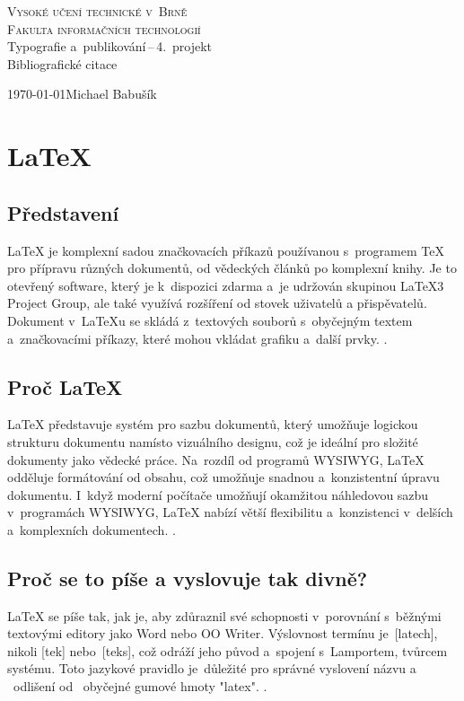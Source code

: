 \documentclass[a4paper, 11pt]{article}
\begin{document}
\begin{titlepage}
    \begin{center}
        \Huge \textsc{Vysoké učení technické v~Brně} \\
        \huge \textsc{Fakulta informačních technologií} \\
        \LARGE{Typografie a~publikování\,--\,4.~projekt} \\
        \Huge{Bibliografické citace}
    \end{center}

    {\Large \today \hfill Michael Babušík}
\end{titlepage}

\section{\LaTeX}
\subsection{Představení}
\LaTeX{} je komplexní sadou značkovacích příkazů používanou s~programem \TeX{} pro přípravu různých dokumentů, od vědeckých článků po komplexní knihy. 
Je to otevřený software, který je k~dispozici zdarma a~je udržován skupinou \LaTeX3 Project Group, ale také využívá rozšíření od stovek uživatelů a přispěvatelů. 
Dokument v~\LaTeX{}u se skládá z~textových souborů s~obyčejným textem a~značkovacími příkazy, které mohou vkládat grafiku a~další prvky.
\cite{Kopka_Daly2004}.

\subsection{Proč \LaTeX}
\LaTeX{} představuje systém pro sazbu dokumentů, který umožňuje logickou strukturu dokumentu namísto vizuálního designu, což je ideální pro složité dokumenty jako vědecké práce. 
Na~rozdíl od programů WYSIWYG, \LaTeX{} odděluje formátování od obsahu, což umožňuje snadnou a~konzistentní úpravu dokumentu. 
I~když moderní počítače umožňují okamžitou náhledovou sazbu v~programách WYSIWYG, \LaTeX{} nabízí větší flexibilitu a~konzistenci v~delších a~komplexních dokumentech.
\cite{Lamport1994}.

\subsection{Proč se to píše a vyslovuje tak divně?}
\LaTeX{} se píše tak, jak je, aby zdůraznil své schopnosti v~porovnání s~běžnými textovými editory jako Word nebo OO Writer.
Výslovnost termínu je~[latech], nikoli [tek] nebo~[teks], což odráží jeho původ a~spojení s~Lamportem, tvůrcem systému.
Toto jazykové pravidlo je~důležité pro správné vyslovení názvu a ~odlišení od ~obyčejné gumové hmoty "latex".
\cite{Martinek2010}.
\end{document}
